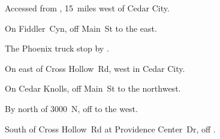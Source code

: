 
\begin{LocationList}

Accessed from , 15~miles west of Cedar City.

On Fiddler~Cyn, off  Main~St to the east.

The Phoenix truck stop by  .

On  east of Cross Hollow~Rd, west in Cedar City.

On Cedar Knolls, off  Main~St to the northwest.

By  north of 3000~N, off   to the west.

South of Cross Hollow~Rd at Providence Center~Dr, off  .

\end{LocationList}
